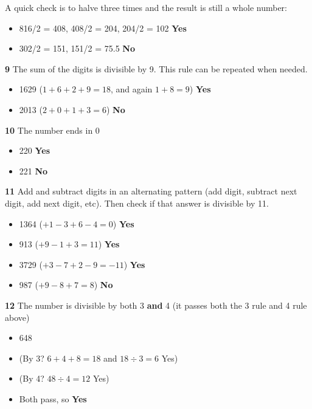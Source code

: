 A quick check is to halve three times and the result is still a whole number:

\begin{itemize}
  \item 816/2 = 408, 408/2 = 204, 204/2 = 102 \textbf{Yes}
  \item 302/2 = 151, 151/2 = 75.5 \textbf{No}
\end{itemize}

\vspace{7 mm}

\textbf{9} The sum of the digits is divisible by 9. This rule can be repeated when needed.

\begin{itemize}
  \item 1629 ($1+6+2+9=18$, and again $1+8=9$) \textbf{Yes}
  \item 2013 ($2+0+1+3=6$) \textbf{No}
\end{itemize}

\textbf{10} The number ends in 0

\begin{itemize}
  \item 220 \textbf{Yes}
  \item 221 \textbf{No}
\end{itemize}

\textbf{11} Add and subtract digits in an alternating pattern (add digit, subtract next digit, add next digit, etc). Then check if that answer is divisible by 11.

\begin{itemize}
  \item 1364 ($+1-3+6-4=0$) \textbf{Yes}
  \item 913 ($+9-1+3=11$) \textbf{Yes}
  \item 3729 ($+3-7+2-9=-11$) \textbf{Yes}
  \item 987 ($+9-8+7=8$) \textbf{No}
\end{itemize}

\vspace{7 mm}

\textbf{12} The number is divisible by both 3 \textbf{and} 4 (it passes both the 3 rule and 4 rule above)

\begin{itemize}
  \item 648
  \item (By 3? $6+4+8=18$ and $18\div 3=6$ Yes)
  \item (By 4? $48\div 4=12$ Yes)
  \item Both pass, so \textbf{Yes}
\end{itemize}

